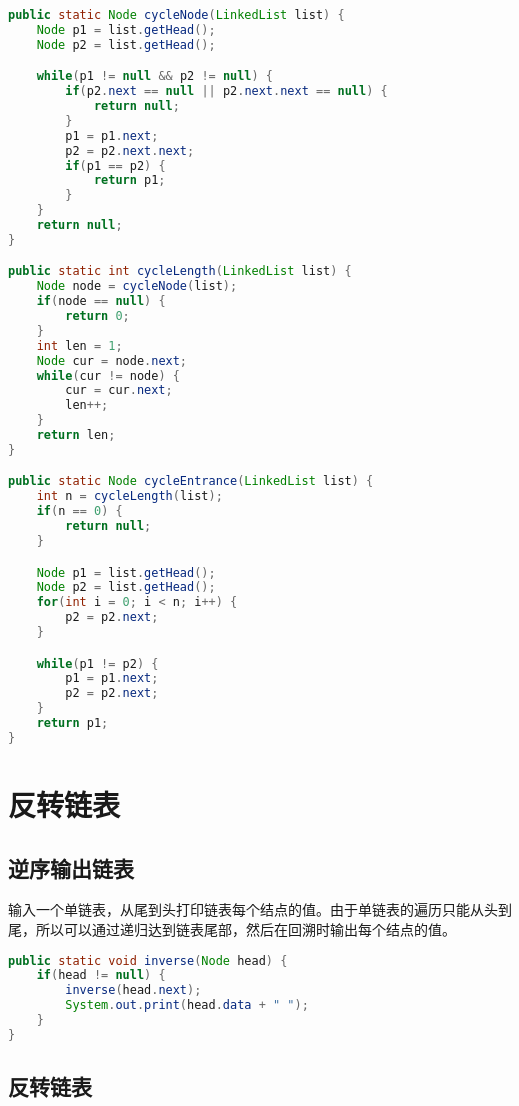 
\begin{lstlisting}[language=Java]
public static Node cycleNode(LinkedList list) {
    Node p1 = list.getHead();
    Node p2 = list.getHead();

    while(p1 != null && p2 != null) {
        if(p2.next == null || p2.next.next == null) {
            return null;
        }
        p1 = p1.next;
        p2 = p2.next.next;
        if(p1 == p2) {
            return p1;
        }
    }
    return null;
}

public static int cycleLength(LinkedList list) {
    Node node = cycleNode(list);
    if(node == null) {
        return 0;
    }
    int len = 1;
    Node cur = node.next;
    while(cur != node) {
        cur = cur.next;
        len++;
    }
    return len;
}

public static Node cycleEntrance(LinkedList list) {
    int n = cycleLength(list);
    if(n == 0) {
        return null;
    }

    Node p1 = list.getHead();
    Node p2 = list.getHead();
    for(int i = 0; i < n; i++) {
        p2 = p2.next;
    }

    while(p1 != p2) {
        p1 = p1.next;
        p2 = p2.next;
    }
    return p1;
}
\end{lstlisting}

\newpage

\section{反转链表}

\subsection{逆序输出链表}

输入一个单链表，从尾到头打印链表每个结点的值。由于单链表的遍历只能从头到尾，所以可以通过递归达到链表尾部，然后在回溯时输出每个结点的值。 \\


\begin{lstlisting}[language=Java]
public static void inverse(Node head) {
    if(head != null) {
        inverse(head.next);
        System.out.print(head.data + " ");
    }
}
\end{lstlisting}

\subsection{反转链表}

